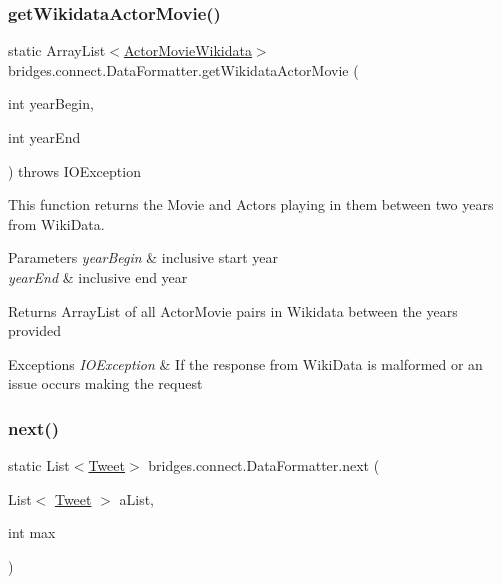 \subsubsection{\texorpdfstring{get\+Wikidata\+Actor\+Movie()}{getWikidataActorMovie()}}
{\footnotesize\ttfamily static Array\+List$<$\hyperlink{classbridges_1_1data__src__dependent_1_1_actor_movie_wikidata}{Actor\+Movie\+Wikidata}$>$ bridges.\+connect.\+Data\+Formatter.\+get\+Wikidata\+Actor\+Movie (\begin{DoxyParamCaption}\item[{int}]{year\+Begin,  }\item[{int}]{year\+End }\end{DoxyParamCaption}) throws I\+O\+Exception\hspace{0.3cm}{\ttfamily [static]}}



This function returns the Movie and Actors playing in them between two years from Wiki\+Data. 


\begin{DoxyParams}{Parameters}
{\em year\+Begin} & inclusive start year \\
\hline
{\em year\+End} & inclusive end year \\
\hline
\end{DoxyParams}
\begin{DoxyReturn}{Returns}
Array\+List of all Actor\+Movie pairs in Wikidata between the years provided 
\end{DoxyReturn}

\begin{DoxyExceptions}{Exceptions}
{\em I\+O\+Exception} & If the response from Wiki\+Data is malformed or an issue occurs making the request \\
\hline
\end{DoxyExceptions}
\mbox{\label{classbridges_1_1connect_1_1_data_formatter_a3d0b2d2e0384d2a537bb61fbeb3d00a4}} 
\subsubsection{\texorpdfstring{next()}{next()}\hspace{0.1cm}{\footnotesize\ttfamily [1/2]}}
{\footnotesize\ttfamily static List$<$\hyperlink{classbridges_1_1data__src__dependent_1_1_tweet}{Tweet}$>$ bridges.\+connect.\+Data\+Formatter.\+next (\begin{DoxyParamCaption}\item[{List$<$ \hyperlink{classbridges_1_1data__src__dependent_1_1_tweet}{Tweet} $>$}]{a\+List,  }\item[{int}]{max }\end{DoxyParamCaption})\hspace{0.3cm}{\ttfamily [static]}}

